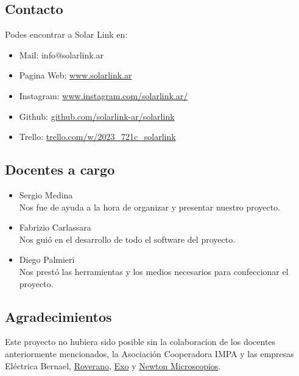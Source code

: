 \subsection{Contacto}
Podes encontrar a Solar Link en:

\begin{itemize}
\item Mail: info@solarlink.ar
\item Pagina Web: \href{https://www.solarlink.ar}{www.solarlink.ar}
\item Instagram: \href{https://www.instagram.com/solarlink.ar/}{www.instagram.com/solarlink.ar/}
\item Github: \href{https://github.com/solarlink-ar/solarlink}{github.com/solarlink-ar/solarlink}
\item Trello: \href{https://trello.com/w/2023_721c_solarlink}{trello.com/w/2023\_721c\_solarlink}
\end{itemize}

\subsection{Docentes a cargo}

\begin{itemize}
\item Sergio Medina \\ Nos fue de ayuda a la hora de organizar y presentar nuestro proyecto.
\item Fabrizio Carlassara \\ Nos guió en el desarrollo de todo el software del proyecto. 
\item Diego Palmieri \\ Nos prestó las herramientas y los medios necesarios para confeccionar el proyecto.
\end{itemize}

\subsection{Agradecimientos}
Este proyecto no hubiera sido posible sin la colaboracion de los docentes anteriormente mencionados, la Asociación Cooperadora IMPA y las empresas Eléctrica Bernael, \href{www.bateriasroverano.com.ar}{Roverano}, \href{www.exo.com.ar}{Exo} y \href{www.newtonmicroscopios.com}{Newton Microscopios}.
